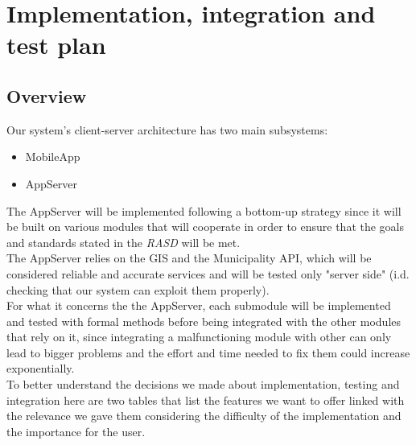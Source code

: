 \section{Implementation, integration and test plan}

    \subsection{Overview}

        Our system's client-server architecture has two main subsystems:
        \begin{itemize}           
            \item MobileApp
            \item AppServer
        \end{itemize}
        
        The AppServer will be implemented following a bottom-up strategy since it will be built on various modules that will cooperate in order
        to ensure that the goals and standards stated in the \emph{RASD}\cite{RASD} will be met.\\
        The AppServer relies on the GIS and the Municipality API, which will be considered reliable and accurate services and will be
        tested only "server side" (i.d. checking that our system can exploit them properly).\\
        For what it concerns the the AppServer, each submodule will be implemented and tested with formal methods before being integrated 
        with the other modules that rely on it, since integrating a malfunctioning module with other can only lead to bigger problems 
        and the effort and time needed to fix them could increase exponentially.\\
        To better understand the decisions we made about implementation, testing and integration here are two tables that list the features
        we want to offer linked with the relevance we gave them considering the difficulty of the implementation and the importance for 
        the user.\\

